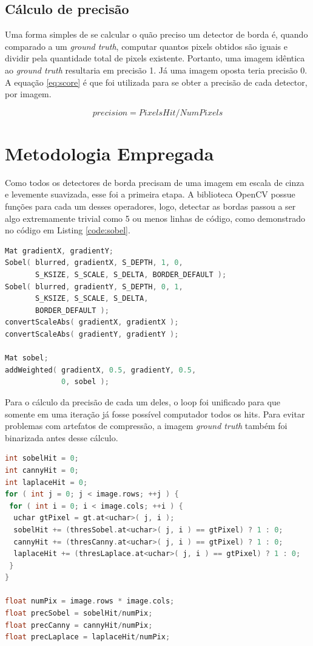 \documentclass[10pt,twocolumn,letterpaper]{article}
\begin{document}
\subsection{Cálculo de precisão}
Uma forma simples de se calcular o quão preciso um detector de borda é, quando comparado a um \emph{ground truth}, computar quantos pixels obtidos são iguais e dividir pela quantidade total de pixels existente. Portanto, uma imagem idêntica ao \emph{ground truth} resultaria em precisão 1. Já uma imagem oposta teria precisão 0. A equação \ref{eq:score} é que foi utilizada para se obter a precisão de cada detector, por imagem.

\begin{equation}
precision = PixelsHit/NumPixels
\label{eq:score}
\end{equation}

\section{Metodologia Empregada}
Como todos os detectores de borda precisam de uma imagem em escala de cinza e levemente suavizada, esse foi a primeira etapa. A biblioteca OpenCV possue funções para cada um desses operadores, logo, detectar as bordas passou a ser algo extremamente trivial como 5 ou menos linhas de código, como demonstrado no código em Listing \ref{code:sobel}.

\begin{lstlisting}[language=C++, caption={Obtenção das bordas por Sobel. Esse foi o maior procedimento dos três.}, label={code:sobel}]
Mat gradientX, gradientY;
Sobel( blurred, gradientX, S_DEPTH, 1, 0,
       S_KSIZE, S_SCALE, S_DELTA, BORDER_DEFAULT );
Sobel( blurred, gradientY, S_DEPTH, 0, 1,
       S_KSIZE, S_SCALE, S_DELTA,
       BORDER_DEFAULT );
convertScaleAbs( gradientX, gradientX );
convertScaleAbs( gradientY, gradientY );

Mat sobel;
addWeighted( gradientX, 0.5, gradientY, 0.5,
             0, sobel );
\end{lstlisting}

Para o cálculo da precisão de cada um deles, o loop foi unificado para que somente em uma iteração já fosse possível computador todos os hits. Para evitar problemas com artefatos de compressão, a imagem \emph{ground truth} também foi binarizada antes desse cálculo.

\begin{lstlisting}[language=C++, caption={Obtendo precisão dos detectores}, label={code:calcprec}]
int sobelHit = 0;
int cannyHit = 0;
int laplaceHit = 0;
for ( int j = 0; j < image.rows; ++j ) {
 for ( int i = 0; i < image.cols; ++i ) {
  uchar gtPixel = gt.at<uchar>( j, i );
  sobelHit += (thresSobel.at<uchar>( j, i ) == gtPixel) ? 1 : 0;
  cannyHit += (thresCanny.at<uchar>( j, i ) == gtPixel) ? 1 : 0;
  laplaceHit += (thresLaplace.at<uchar>( j, i ) == gtPixel) ? 1 : 0;
 }
}

float numPix = image.rows * image.cols;
float precSobel = sobelHit/numPix;
float precCanny = cannyHit/numPix;
float precLaplace = laplaceHit/numPix;
\end{lstlisting}
\end{document}

